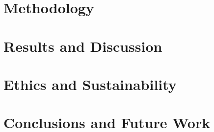 \documentclass[a4paper,12pt]{article}
\begin{document}
\clearpage
\section{Methodology}
\label{sec:method}


\clearpage
\section{Results and Discussion}
\label{sec:result_discussion}


\clearpage
\section{Ethics and Sustainability}
\label{sec:ethics_sustainability}


\clearpage
\section{Conclusions and Future Work}
\label{sec:conclusions}


\newpage


%
%


%

\newpage


\clearpage
\appendix 

\end{document}
